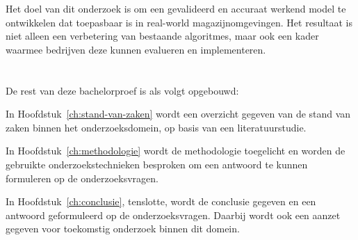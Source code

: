 Het doel van dit onderzoek is om een gevalideerd en accuraat werkend model te ontwikkelen dat toepasbaar is in real-world magazijnomgevingen. Het resultaat is niet alleen een verbetering van bestaande algoritmes, maar ook een kader waarmee bedrijven deze kunnen evalueren en implementeren.

\section{}%
\label{sec:opzet-bachelorproef}


De rest van deze bachelorproef is als volgt opgebouwd:

In Hoofdstuk~\ref{ch:stand-van-zaken} wordt een overzicht gegeven van de stand van zaken binnen het onderzoeksdomein, op basis van een literatuurstudie.

In Hoofdstuk~\ref{ch:methodologie} wordt de methodologie toegelicht en worden de gebruikte onderzoekstechnieken besproken om een antwoord te kunnen formuleren op de onderzoeksvragen.


In Hoofdstuk~\ref{ch:conclusie}, tenslotte, wordt de conclusie gegeven en een antwoord geformuleerd op de onderzoeksvragen. Daarbij wordt ook een aanzet gegeven voor toekomstig onderzoek binnen dit domein.